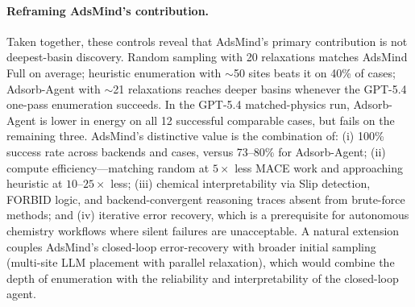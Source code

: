 \paragraph{Reframing AdsMind's contribution.}
Taken together, these controls reveal that AdsMind's primary contribution is not deepest-basin discovery.
Random sampling with 20 relaxations matches AdsMind Full on average; heuristic enumeration with $\sim$50 sites beats it on 40\% of cases; Adsorb-Agent with $\sim$21 relaxations reaches deeper basins whenever the GPT-5.4 one-pass enumeration succeeds.
In the GPT-5.4 matched-physics run, Adsorb-Agent is lower in energy on all 12 successful comparable cases, but fails on the remaining three.
AdsMind's distinctive value is the combination of: (i) 100\% success rate across backends and cases, versus 73--80\% for Adsorb-Agent; (ii) compute efficiency---matching random at $5\times$ less MACE work and approaching heuristic at $10$--$25\times$ less; (iii) chemical interpretability via Slip detection, FORBID logic, and backend-convergent reasoning traces absent from brute-force methods; and (iv) iterative error recovery, which is a prerequisite for autonomous chemistry workflows where silent failures are unacceptable.
A natural extension couples AdsMind's closed-loop error-recovery with broader initial sampling (multi-site LLM placement with parallel relaxation), which would combine the depth of enumeration with the reliability and interpretability of the closed-loop agent.
